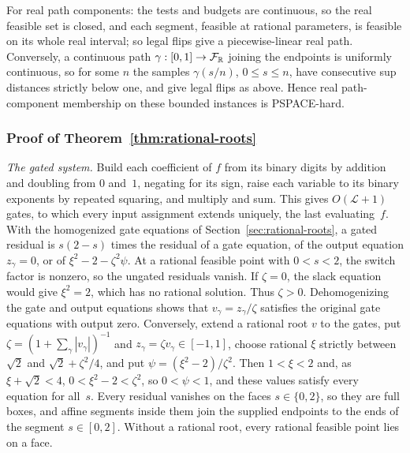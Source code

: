 For real path components: the tests and budgets are continuous, so the
real feasible set is closed, and each segment, feasible at rational
parameters, is feasible on its whole real interval; so legal flips give a
piecewise-linear real path. Conversely, a continuous
path $\gamma:[0,1]\to\mathcal F_{\mathbb{R}}$ joining the endpoints is uniformly continuous,
so for some $n$ the samples $\gamma(s/n)$, $0\le s\le n$, have consecutive
sup distances strictly below one, and give legal flips as above. Hence
real path-component membership on these bounded instances is
PSPACE-hard.

\subsubsection{Proof of Theorem~\ref{thm:rational-roots}}\label{app:rational-roots}

\emph{The gated system.} Build each coefficient of $f$ from its binary
digits by addition and doubling from $0$ and~$1$, negating for its sign,
raise each variable to its binary exponents by repeated squaring, and
multiply and sum. This gives $O(\mathcal L+1)$ gates, to which every input
assignment extends uniquely, the last evaluating~$f$. With the
homogenized gate equations of Section~\ref{sec:rational-roots}, a gated
residual is $s(2-s)$ times the residual of a gate equation, of the output
equation $z_\gamma=0$, or of $\xi^2-2-\zeta^2\psi$. At a rational feasible
point with $0<s<2$, the switch factor is nonzero, so the ungated residuals
vanish. If $\zeta=0$, the slack equation would give $\xi^2=2$, which has
no rational solution. Thus $\zeta>0$. Dehomogenizing the gate and output
equations shows that $v_\gamma=z_\gamma/\zeta$ satisfies the original
gate equations with output zero. Conversely, extend a rational root $v$ to the gates, put
$\zeta=(1+\sum_\gamma|v_\gamma|)^{-1}$ and
$z_\gamma=\zeta v_\gamma\in[-1,1]$, choose rational $\xi$ strictly between
$\sqrt2$ and $\sqrt2+\zeta^2/4$, and put $\psi=(\xi^2-2)/\zeta^2$. Then
$1<\xi<2$ and, as $\xi+\sqrt2<4$, $0<\xi^2-2<\zeta^2$, so $0<\psi<1$, and
these values satisfy every equation for all~$s$. Every residual vanishes on
the faces $s\in\{0,2\}$, so they are full boxes, and affine segments
inside them join the supplied endpoints to the ends of the segment
$s\in[0,2]$. Without a rational root, every rational feasible
point lies on a face.


